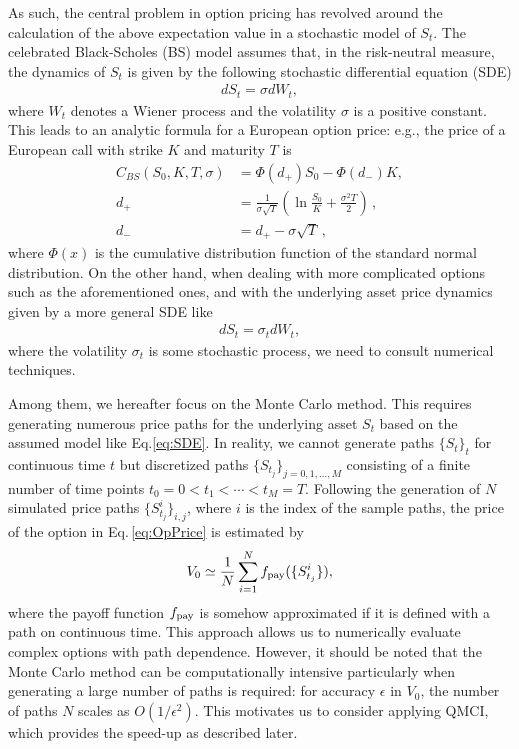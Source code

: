 {As such, the central problem in option pricing has revolved around the calculation of the above expectation value in a stochastic model of $S_t$.
The celebrated Black-Scholes (BS) model \cite{black1973pricing,Merton1973} assumes that, in the risk-neutral measure, the dynamics of $S_t$ is given by the following stochastic differential equation (SDE)
\begin{align}
    dS_t = \sigma dW_t,
    \label{eq:BSSDE}
\end{align}
where $W_t$ denotes a Wiener process and the volatility $\sigma$ is a positive constant. 
This leads to an analytic formula for a European option price: e.g., the price of a European call with strike $K$ and maturity $T$ is
\begin{align}
    C_{BS}(S_0,K,T,\sigma) &= \Phi(d_+) S_0 - \Phi(d_-) K, \\
    d_+ &= \frac{1}{\sigma \sqrt{T}} \left(\ln \frac{S_0}{K} + \frac{\sigma^2 T}{2} \right) \, ,  \\ 
    d_- &= d_+ - \sigma \sqrt{T}  \, , 
\end{align}
where $\Phi(x)$ is the cumulative distribution function of the standard normal distribution.
On the other hand, when dealing with more complicated options such as the aforementioned ones, and with the underlying asset price dynamics given by a more general SDE like
\begin{align}
    dS_t = \sigma_t dW_t,
    \label{eq:SDE}
\end{align}
where the volatility $\sigma_t$ is some stochastic process, we need to consult numerical techniques.

Among them, we hereafter focus on the Monte Carlo method.
This requires generating numerous price paths for the underlying asset $S_t$ based on the assumed model like Eq.\eqref{eq:SDE}. 
In reality, we cannot generate paths $\{S_t\}_t$ for continuous time $t$ but discretized paths $\{S_{t_j}\}_{j=0,1,...,M}$ consisting of a finite number of time points $t_0=0<t_1<\cdots<t_M=T$.
Following the generation of $N$ simulated price paths $\{S_{t_j}^{i}\}_{i,j}$, where $i$ is the index of the sample paths, the price of the option in Eq.\,\eqref{eq:OpPrice} is estimated by 
\begin{align}
    V_0 \simeq \frac{1}{N}\sum_{i=1}^N f_{\rm pay}(\{S_{t_j}^{i}\}),
\end{align}
where the payoff function $f_{\rm pay}$ is somehow approximated if it is defined with a path on continuous time.
This approach allows us to numerically evaluate complex options with path dependence.
However, it should be noted that the Monte Carlo method can be computationally intensive particularly when generating a large number of paths is required: for accuracy $\epsilon$ in $V_0$, the number of paths $N$ scales as $O(1/\epsilon^2)$.
This motivates us to consider applying QMCI, which provides the speed-up as described later.





}
